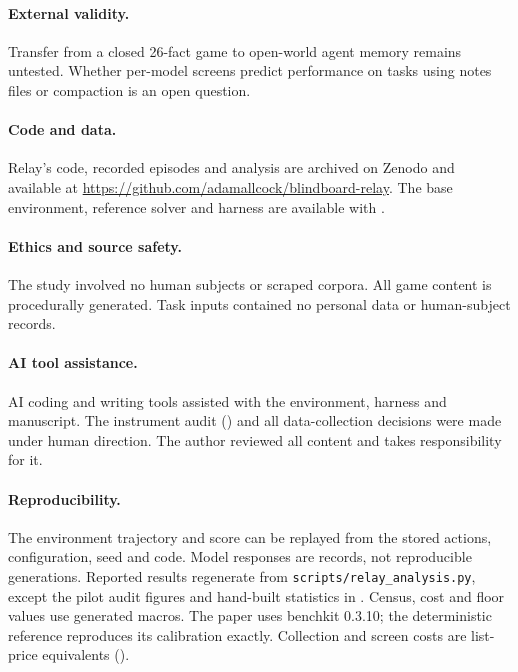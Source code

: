 \paragraph{External validity.} Transfer from a closed 26-fact game to open-world agent memory remains untested. Whether per-model screens predict performance on tasks using notes files or compaction is an open question.

\paragraph{Code and data.} Relay's code, recorded episodes and analysis are archived on Zenodo \citep{relaydata2026} and available at \url{https://github.com/adamallcock/blindboard-relay}. The base environment, reference solver and harness are available with \blindboard{} \citep{blindboarddata2026}.

\paragraph{Ethics and source safety.} The study involved no human subjects or scraped corpora. All game content is procedurally generated. Task inputs contained no personal data or human-subject records.

\paragraph{AI tool assistance.} AI coding and writing tools assisted with the environment, harness and manuscript. The instrument audit () and all data-collection decisions were made under human direction. The author reviewed all content and takes responsibility for it.

\paragraph{Reproducibility.} The environment trajectory and score can be replayed from the stored actions, configuration, seed and code. Model responses are records, not reproducible generations. Reported results regenerate from \texttt{scripts/relay\_analysis.py}, except the pilot audit figures and hand-built statistics in . Census, cost and floor values use generated macros. The paper uses benchkit 0.3.10; the deterministic reference reproduces its calibration exactly. Collection and screen costs are list-price equivalents ().
